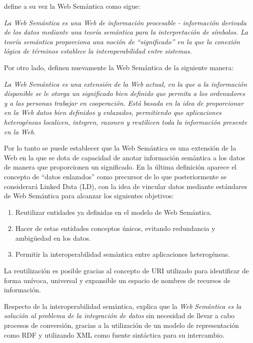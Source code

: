 \cite{Shadbolt:2006:SWR:1155313.1155373} define a su vez la Web Semántica como
sigue: 

\textit{La Web Semántica es una Web de información procesable - información
  derivada de los datos mediante una teoría semántica para la interpretación de
  símbolos. La teoría semántica proporciona una noción de ``significado'' en la que la
  conexión lógica de términos establece la interoperabilidad entre sistemas. }

Por otro lado, \cite{HJBL} definen nuevamente la Web Semántica de la siguiente
manera: 

\textit{La Web Semántica es una extensión de la Web actual, en la que a la
  información disponible se le otorga un significado bien definido que permita a
los ordenadores y a las personas trabajar en cooperación. Está basada en la idea
de proporcionar en la Web datos bien definidos y enlazados, permitiendo que
aplicaciones heterogéneas localicen, integren, razonen y reutilicen toda la
información presente en la Web}. 

Por lo tanto se puede establecer que la Web Semántica es una extensión de la Web
en la que se dota de capacidad de anotar información semántica a los
datos de manera que proporcionen un significado. En la última definición aparece
el concepto de ``datos enlazados'' como precursor de lo que posteriormente se
considerará Linked Data (\acs{LD}), con la idea de vincular datos mediante estándares de Web
Semántica para alcanzar los siguientes objetivos: 

\begin{enumerate}
\item Reutilizar entidades ya definidas en el modelo de Web Semántica.
\item Hacer de estas entidades conceptos únicos, evitando redundancia y
  ambigüedad en los datos. 
\item Permitir la interoperabilidad semántica entre aplicaciones heterogéneas. 
\end{enumerate}

La reutilización es posible gracias al concepto de \acf{URI} utilizado para
identificar de forma unívoca, universal y expansible un espacio de nombres de
recursos de información. 

Respecto de la interoperabilidad semántica, \cite{HALPIN} explica que la
\textit{Web Semántica es la solución al problema de la integración de datos} sin
necesidad de llevar a cabo procesos de conversión, gracias a la utilización de
un modelo de representación como \acf{RDF} y utilizando \acf{XML} como fuente
sintáctica para su intercambio. 



